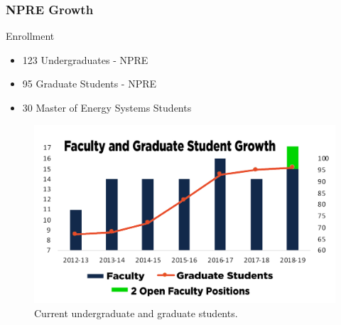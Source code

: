 \begin{frame}
  \frametitle{NPRE Growth}
Enrollment
        \begin{itemize}
                \item 123 Undergraduates - NPRE
                \item 95 Graduate Students - NPRE
                \item 30 Master of Energy Systems Students
        \end{itemize}
               \begin{figure}[t]
                \vspace*{-0.1in}
                \includegraphics[width=\textwidth]{./images/npre_growth.png}
                       \caption{Current undergraduate and graduate students.}
               \end{figure}            
\end{frame}
